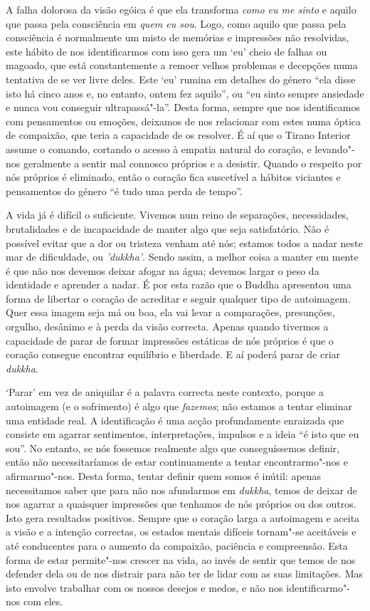 A falha dolorosa da visão egóica é que ela transforma \emph{como eu me
sinto} e aquilo que passa pela consciência em \emph{quem eu sou}. Logo,
como aquilo que passa pela consciência é normalmente um misto de
memórias e impressões não resolvidas, este hábito de nos identificarmos
com isso gera um `eu' cheio de falhas ou magoado, que está
constantemente a remoer velhos problemas e decepções numa tentativa de
se ver livre deles. Este `eu' rumina em detalhes do género “ela disse
isto há cinco anos e, no entanto, ontem fez aquilo”, ou “eu sinto sempre
ansiedade e nunca vou conseguir ultrapassá"-la”. Desta forma, sempre que
nos identificamos com pensamentos ou emoções, deixamos de nos relacionar
com estes numa óptica de compaixão, que teria a capacidade de os
resolver. É aí que o Tirano Interior assume o comando, cortando o acesso
à empatia natural do coração, e levando"-nos geralmente a sentir mal
connosco próprios e a desistir. Quando o respeito por nós próprios é
eliminado, então o coração fica suscetível a hábitos viciantes e
pensamentos do género “é tudo uma perda de tempo”.

A vida já é difícil o suficiente. Vivemos num reino de separações,
necessidades, brutalidades e de incapacidade de manter algo que seja
satisfatório. Não é possível evitar que a dor ou tristeza venham até
nós; estamos todos a nadar neste mar de dificuldade, ou \emph{'dukkha'}.
Sendo assim, a melhor coisa a manter em mente é que não nos devemos
deixar afogar na água; devemos largar o peso da identidade e aprender a
nadar. É por esta razão que o Buddha apresentou uma forma de libertar o
coração de acreditar e seguir qualquer tipo de autoimagem. Quer essa
imagem seja má ou boa, ela vai levar a comparações, presunções, orgulho,
desânimo e à perda da visão correcta. Apenas quando tivermos a capacidade
de parar de formar impressões estáticas de nós próprios é que o coração
consegue encontrar equilíbrio e liberdade. E aí poderá parar de criar
\emph{dukkha}.

`Parar' em vez de aniquilar é a palavra correcta neste contexto, porque
a autoimagem (e o sofrimento) é algo que \emph{fazemos}; não estamos a
tentar eliminar uma entidade real. A identificação é uma acção
profundamente enraizada que consiste em agarrar sentimentos,
interpretações, impulsos e a ideia “é isto que eu sou”. No entanto, se
nós fossemos realmente algo que conseguíssemos definir, então não
necessitaríamos de estar continuamente a tentar encontrarmo"-nos e
afirmarmo"-nos. Desta forma, tentar definir quem somos é inútil: apenas
necessitamos saber que para não nos afundarmos em \emph{dukkha}, temos
de deixar de nos agarrar a quaisquer impressões que tenhamos de nós
próprios ou dos outros. Isto gera resultados positivos. Sempre que o
coração larga a autoimagem e aceita a visão e a intenção correctas, os
estados mentais difíceis tornam"-se aceitáveis e até conducentes para o
aumento da compaixão, paciência e compreensão. Esta forma de estar
permite"-nos crescer na vida, ao invés de sentir que temos de nos
defender dela ou de nos distrair para não ter de lidar com as suas
limitações. Mas isto envolve trabalhar com os nossos desejos e medos, e
não nos identificarmo"-nos com eles.


